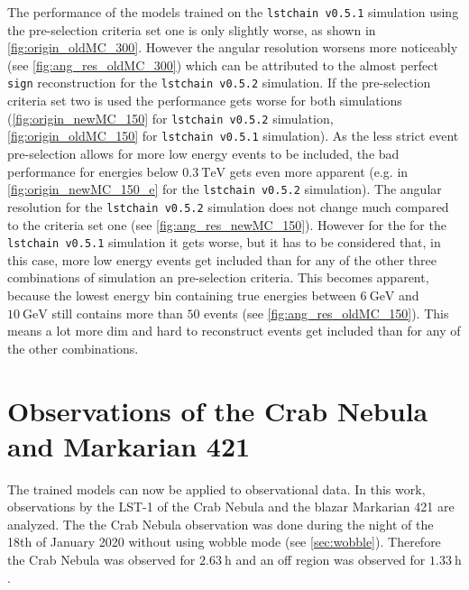 The performance of the models trained on the \texttt{lstchain v0.5.1} simulation using the pre-selection criteria set one is only slightly worse, 
as shown in \autoref{fig:origin_oldMC_300}.
However the angular resolution worsens more noticeably (see \autoref{fig:ang_res_oldMC_300}) which can be attributed to the almost perfect \texttt{sign}
reconstruction for the \texttt{lstchain v0.5.2} simulation.
If the pre-selection criteria set two is used the performance gets worse for both simulations 
(\autoref{fig:origin_newMC_150} for \texttt{lstchain v0.5.2} simulation, \autoref{fig:origin_oldMC_150} for \texttt{lstchain v0.5.1} simulation).
As the less strict event pre-selection allows for more low energy events to be included, the bad performance for energies below $\SI{0.3}{\tera\electronvolt}$
gets even more apparent (e.g. in \autoref{fig:origin_newMC_150_e} for the \texttt{lstchain v0.5.2} simulation).
The angular resolution for the \texttt{lstchain v0.5.2} simulation does not change much compared to the criteria set one (see \autoref{fig:ang_res_newMC_150}).
However for the for the \texttt{lstchain v0.5.1} simulation it gets worse, but it has to be considered that, in this case, more low energy events get included 
than for any of the other three combinations of simulation an pre-selection criteria.
This becomes apparent, because the lowest energy bin containing true energies between $\SI{6}{\giga\electronvolt}$ and $\SI{10}{\giga\electronvolt}$ 
still contains more than $\num{50}$ events (see \autoref{fig:ang_res_oldMC_150}).
This means a lot more dim and hard to reconstruct events get included than for any of the other combinations.


\section{Observations of the Crab Nebula and Markarian 421}
The trained models can now be applied to observational data.
In this work, observations by the LST-1 of the Crab Nebula and the blazar Markarian 421 are analyzed.
The the Crab Nebula observation was done during the night of the 18th of January 2020 without using wobble mode (see \autoref{sec:wobble}).
Therefore the Crab Nebula was observed for $\SI{2.63}{\hour}$ and an off region was observed for $\SI{1.33}{\hour}$.

